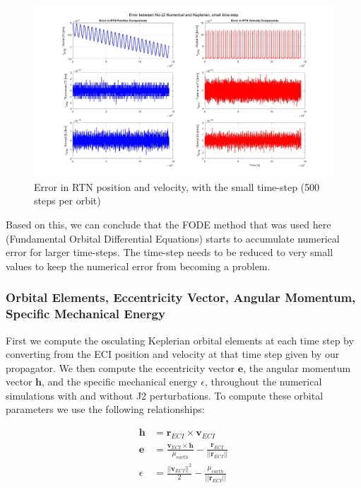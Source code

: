 \begin{figure}[H]
    \centering
    \includegraphics[width=0.75\linewidth]{PS1/Figures/comparing_rtn_small_timestep.jpg}
    \caption{Error in RTN position and velocity, with the small time-step (500 steps per orbit)}
    \label{fig:rtn_compare_small_timestep}
\end{figure}

Based on this, we can conclude that the FODE method that was used here (Fundamental Orbital Differential Equations) starts to accumulate numerical error for larger time-steps. The time-step needs to be reduced to very small values to keep the numerical error from becoming a problem.

\subsubsection{Orbital Elements, Eccentricity Vector, Angular Momentum, Specific Mechanical Energy} \label{sec:oe_compares}

First we compute the osculating Keplerian orbital elements at each time step by converting from the ECI position and velocity at that time step given by our propagator. We then compute the eccentricity vector $\boldsymbol{e}$, the angular momentum vector $\boldsymbol{h}$, and the specific mechanical energy $\epsilon$, throughout the numerical simulations with and without J2 perturbations. To compute these orbital parameters we use the following relationships:

\begin{align*}
    \boldsymbol{h} &= \boldsymbol{r}_{ECI} \times \boldsymbol{v}_{ECI} \\
    \boldsymbol{e} &= \frac{\boldsymbol{v}_{ECI} \times \boldsymbol{h}}{\mu_{earth}} - \frac{\boldsymbol{r}_{ECI}}{||\boldsymbol{r}_{ECI}||} \\
    \epsilon &= \frac{||\boldsymbol{v}_{ECI}||^2}{2} - \frac{\mu_{earth}}{||\boldsymbol{r}_{ECI}||}
\end{align*}

